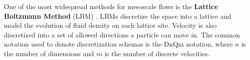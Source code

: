 \documentclass[conference]{IEEEtran}
\begin{document}
One of the most widespread methods for mesoscale flows is the \textbf{Lattice Boltzmann Method} (LBM) \cite{chen1998lattice}.
LBMs discretize the space into a lattice and model the evolution of fluid density on each lattice site.
Velocity is also discretized into a set of allowed directions a particle can move in.
The common notation used to denote discretization schemas is the DnQm notation, where $n$ is the number of dimensions and $m$ is the number of discrete velocities.
\begin{figure}[t!]


    \begin{tikzpicture}[x=0.75pt,y=0.75pt,yscale=-1,xscale=1]
    

\end{tikzpicture}
\end{figure}
\end{document}
